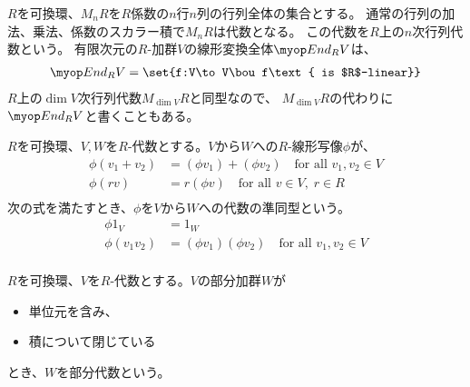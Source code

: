 	\begin{definition}[行列代数]\label{def:行列代数} %
		$R$を可換環、$M_nR$を$R$係数の$n$行$n$列の行列全体の集合とする。
		通常の行列の加法、乗法、係数のスカラー積で$M_nR$は代数となる。
		この代数を$R$上の$n$次行列代数という。
		有限次元の$R$-加群$V$の線形変換全体$\End_RV$は、
		\begin{equation*}\begin{split} %
			\End_RV=\set{f:V\to V\bou f\text{ is $R$-linear}}
		\end{split}\end{equation*} %
		$R$上の$\dim V$次行列代数$M_{\dim V}R$と同型なので、
		$M_{\dim V}R$の代わりに$\End_RV$と書くこともある。
	\end{definition} %

	\begin{definition}[代数の準同型]\label{def:代数の準同型} %
		$R$を可換環、$V,W$を$R$-代数とする。$V$から$W$への$R$-線形写像$\phi$が、
		\begin{equation*}\begin{split} %
			\phi(v_1+v_2) &= (\phi v_1) + (\phi v_2)
				\quad\text{for all }v_1,v_2\in V \\
			\phi(rv) &= r(\phi v)
				\quad\text{for all }v\in V,\;r\in R \\
		\end{split}\end{equation*} %
		次の式を満たすとき、$\phi$を$V$から$W$への代数の準同型という。
		\begin{equation*}\begin{split} %
			\phi 1_V &= 1_W \\
			\phi(v_1v_2) &= (\phi v_1)(\phi v_2) 
				\quad\text{for all }v_1,v_2\in V \\
		\end{split}\end{equation*} %
	\end{definition} %

	\begin{definition}[部分代数]\label{def:部分代数} %
		$R$を可換環、$V$を$R$-代数とする。$V$の部分加群$W$が
		\begin{itemize}\setlength{\itemsep}{-1mm} %
			\item 単位元を含み、
			\item 積について閉じている
		\end{itemize} %
		とき、$W$を部分代数という。
	\end{definition} %

